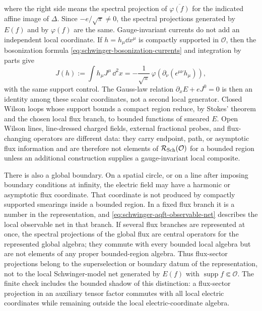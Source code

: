 where the right side means the spectral projection of
\(\overline{\varphi(f)}\) for the indicated affine image of \(\Delta\).  Since
\(-e/\sqrt\pi\neq0\), the spectral projections generated by \(E(f)\) and by
\(\varphi(f)\) are the same.  Gauge-invariant currents do not add an
independent local coordinate.  If \(h=h_\mu\dd x^\mu\) is compactly supported
in \(\mathcal O\), then the bosonization formula
\eqref{eq:schwinger-bosonization-currents} and integration by parts give
\begin{equation}
  J(h)
  :=
  \int h_\mu J^\mu\,\dd^2x
  =
  -\frac1{\sqrt\pi}\,
  \varphi\!\left(\partial_\nu(\epsilon^{\mu\nu}h_\mu)\right),
  \label{eq:schwinger-aqft-current-smeared-coordinate}
\end{equation}
with the same support control.  The Gauss-law relation
\(\partial_xE+eJ^0=0\) is then an identity among these scalar coordinates,
not a second local generator.  Closed Wilson loops whose support bounds a
compact region reduce, by Stokes' theorem and the chosen local flux branch,
to bounded functions of smeared \(E\).  Open Wilson lines, line-dressed
charged fields, external fractional probes, and flux-changing operators are
different data: they carry endpoint, path, or asymptotic flux information and
are therefore not elements of \(\mathcal R_{\rm Sch}(\mathcal O)\) for a
bounded region unless an additional construction supplies a gauge-invariant
local composite.

There is also a global boundary.  On a spatial circle, or on a line after
imposing boundary conditions at infinity, the electric field may have a
harmonic or asymptotic flux coordinate.  That coordinate is not produced by
compactly supported smearings inside a bounded region.  In a fixed flux branch
it is a number in the representation, and
\eqref{eq:schwinger-aqft-observable-net} describes the local observable net in
that branch.  If several flux branches are represented at once, the spectral
projections of the global flux are central operators for the represented
global algebra; they commute with every bounded local algebra but are not
elements of any proper bounded-region algebra.  Thus flux-sector projections
belong to the superselection or boundary datum of the representation, not to
the local Schwinger-model net generated by \(E(f)\) with
\(\operatorname{supp} f\Subset\mathcal O\).  The finite check
 includes the bounded
shadow of this distinction: a flux-sector projection in an auxiliary tensor
factor commutes with all local electric coordinates while remaining outside the
local electric-coordinate algebra.

